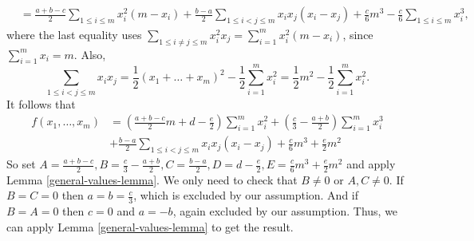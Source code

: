 \documentclass[11pt]{article}
\let\oldendproof\endproof
\renewenvironment{proof}[1][\proofname]{%
	\oldproof[\bf #1]%
}{\oldendproof}
\theoremstyle{plain}
\begin{document}
\begin{proof}[Proof of Lemma \ref{corollary-1}]
\begin{align*}
        &= \frac{a+b-c}{2} \sum_{1 \leq i \leq m} x_i^2 (m-x_i) + \frac{b-a}{2} \sum_{1 \leq i < j \leq m} x_i x_j (x_i-x_j) + \frac{c}{6} m^3 - \frac{c}{6} \sum_{1 \leq i \leq m} x_i^3,
    \end{align*}
    where the last equality uses 
    $\sum_{1 \leq i \neq j \leq m} x_i^2 x_j = \sum_{i=1}^m x_i^2(m-x_i)$, since $\sum_{i=1}^m x_i = m$.
    Also,
    $$\sum_{1 \leq i < j \leq m} x_i x_j = \frac{1}{2}(x_1 + \dots + x_m)^2 - \frac{1}{2}\sum_{i=1}^m x_i^2 = 
    \frac{1}{2}m^2 - \frac{1}{2}\sum_{i=1}^m x_i^2.$$
    It follows that
    \begin{align*}
        f(x_1,\dots,x_m) &= 
    \left( \frac{a+b-c}{2}m + d - \frac{e}{2} \right) \sum_{i=1}^m x_i^2 + \left( \frac{c}{3} - \frac{a+b}{2} \right)\sum_{i=1}^m x_i^3 \\ &+ 
    \frac{b-a}{2} \sum_{1 \leq i < j \leq m} x_i x_j (x_i-x_j) + \frac{c}{6}m^3 + \frac{e}{2}m^2
    \end{align*}
    So set $A=\frac{a+b-c}{2}, B = \frac{c}{3} - \frac{a+b}{2}, C = \frac{b-a}{2}, D = d - \frac{e}{2}, E = \frac{c}{6} m^3 + \frac{e}{2} m^2$ and apply Lemma \ref{general-values-lemma}. We only need to check that $B \neq 0$ or $A,C \neq 0$. If $B = C = 0$ then $a=b=\frac{c}{3}$, which is excluded by our assumption. And if $B = A = 0$ then $c = 0$ and $a = -b$, again excluded by our assumption.  
    Thus, we can apply Lemma \ref{general-values-lemma} to get the result. 
\end{proof}




\end{document}
